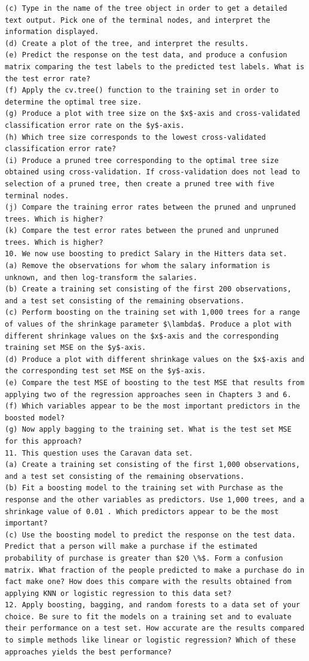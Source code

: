 \documentclass[10pt]{article}
\begin{document}
\begin{verbatim}
(c) Type in the name of the tree object in order to get a detailed text output. Pick one of the terminal nodes, and interpret the information displayed.
(d) Create a plot of the tree, and interpret the results.
(e) Predict the response on the test data, and produce a confusion matrix comparing the test labels to the predicted test labels. What is the test error rate?
(f) Apply the cv.tree() function to the training set in order to determine the optimal tree size.
(g) Produce a plot with tree size on the $x$-axis and cross-validated classification error rate on the $y$-axis.
(h) Which tree size corresponds to the lowest cross-validated classification error rate?
(i) Produce a pruned tree corresponding to the optimal tree size obtained using cross-validation. If cross-validation does not lead to selection of a pruned tree, then create a pruned tree with five terminal nodes.
(j) Compare the training error rates between the pruned and unpruned trees. Which is higher?
(k) Compare the test error rates between the pruned and unpruned trees. Which is higher?
10. We now use boosting to predict Salary in the Hitters data set.
(a) Remove the observations for whom the salary information is unknown, and then log-transform the salaries.
(b) Create a training set consisting of the first 200 observations, and a test set consisting of the remaining observations.
(c) Perform boosting on the training set with 1,000 trees for a range of values of the shrinkage parameter $\lambda$. Produce a plot with different shrinkage values on the $x$-axis and the corresponding training set MSE on the $y$-axis.
(d) Produce a plot with different shrinkage values on the $x$-axis and the corresponding test set MSE on the $y$-axis.
(e) Compare the test MSE of boosting to the test MSE that results from applying two of the regression approaches seen in Chapters 3 and 6.
(f) Which variables appear to be the most important predictors in the boosted model?
(g) Now apply bagging to the training set. What is the test set MSE for this approach?
11. This question uses the Caravan data set.
(a) Create a training set consisting of the first 1,000 observations, and a test set consisting of the remaining observations.
(b) Fit a boosting model to the training set with Purchase as the response and the other variables as predictors. Use 1,000 trees, and a shrinkage value of 0.01 . Which predictors appear to be the most important?
(c) Use the boosting model to predict the response on the test data. Predict that a person will make a purchase if the estimated probability of purchase is greater than $20 \%$. Form a confusion matrix. What fraction of the people predicted to make a purchase do in fact make one? How does this compare with the results obtained from applying KNN or logistic regression to this data set?
12. Apply boosting, bagging, and random forests to a data set of your choice. Be sure to fit the models on a training set and to evaluate their performance on a test set. How accurate are the results compared to simple methods like linear or logistic regression? Which of these approaches yields the best performance?


\end{verbatim}
\end{document}
